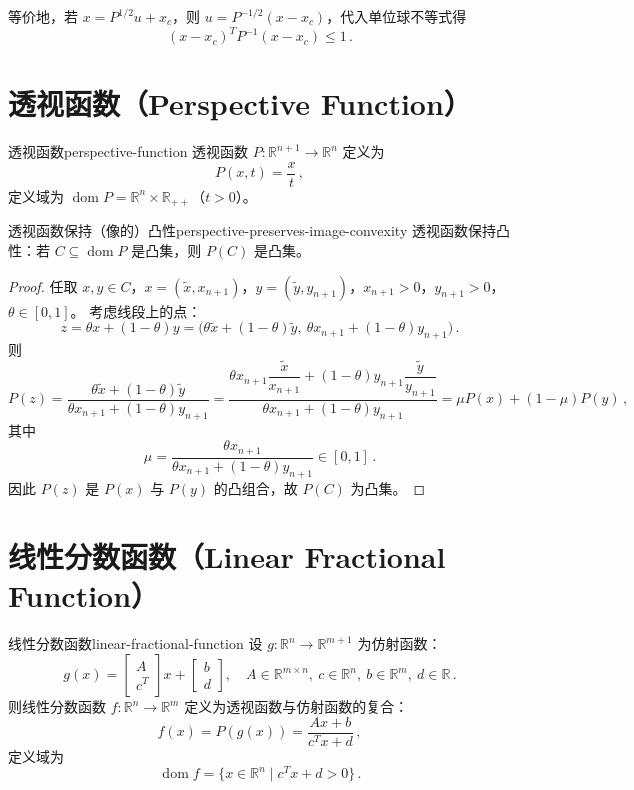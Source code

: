 \documentclass[11pt,a4paper]{article}
\begin{document}
等价地，若 $x = P^{1/2} u + x_c$，则 $u = P^{-1/2}(x - x_c)$，代入单位球不等式得
\[
(x - x_c)^T P^{-1} (x - x_c) \leq 1\,.
\]

\section{透视函数（Perspective Function）}

\begin{definition}{透视函数}{perspective-function}
透视函数 $P: \mathbb{R}^{n+1} \to \mathbb{R}^n$ 定义为
\[
P(x,t) = \frac{x}{t}\,,
\]
定义域为 $\operatorname{dom} P = \mathbb{R}^n \times \mathbb{R}_{++}$（$t > 0$）。
\end{definition}

\begin{theorem}{透视函数保持（像的）凸性}{perspective-preserves-image-convexity}
透视函数保持凸性：若 $C \subseteq \operatorname{dom} P$ 是凸集，则 $P(C)$ 是凸集。
\end{theorem}

\begin{proof}
任取 $x,y \in C$，$x = (\tilde{x}, x_{n+1})$，$y = (\tilde{y}, y_{n+1})$，$x_{n+1}>0$，$y_{n+1}>0$，$\theta \in [0,1]$。
考虑线段上的点：
\[
z = \theta x + (1-\theta)y = \bigl( \theta \tilde{x} + (1-\theta)\tilde{y},\ \theta x_{n+1} + (1-\theta)y_{n+1} \bigr)\,.
\]
则
\[
P(z) = \frac{\theta \tilde{x} + (1-\theta)\tilde{y}}{\theta x_{n+1} + (1-\theta)y_{n+1}}
= \frac{ \theta x_{n+1} \dfrac{\tilde{x}}{x_{n+1}} + (1-\theta)y_{n+1} \dfrac{\tilde{y}}{y_{n+1}} }{ \theta x_{n+1} + (1-\theta)y_{n+1} }
= \mu P(x) + (1-\mu) P(y)\,,
\]
其中
\[
\mu = \frac{\theta x_{n+1}}{\theta x_{n+1} + (1-\theta)y_{n+1}} \in [0,1]\,.
\]
因此 $P(z)$ 是 $P(x)$ 与 $P(y)$ 的凸组合，故 $P(C)$ 为凸集。
\end{proof}

\section{线性分数函数（Linear Fractional Function）}\label{sec:ch2-linear-fractional}

\begin{definition}{线性分数函数}{linear-fractional-function}
设 $g: \mathbb{R}^n \to \mathbb{R}^{m+1}$ 为仿射函数：
\[
g(x) = \begin{bmatrix} A \\ c^T \end{bmatrix} x + \begin{bmatrix} b \\ d \end{bmatrix},\quad A \in \mathbb{R}^{m \times n},\ c \in \mathbb{R}^n,\ b \in \mathbb{R}^m,\ d \in \mathbb{R}\,.
\]
则线性分数函数 $f: \mathbb{R}^n \to \mathbb{R}^m$ 定义为透视函数与仿射函数的复合：
\[
f(x) = P(g(x)) = \frac{Ax + b}{c^T x + d}\,,
\]
定义域为
\[
\operatorname{dom} f = \{ x \in \mathbb{R}^n \mid c^T x + d > 0 \}\,.
\]
\end{definition}
\end{document}
